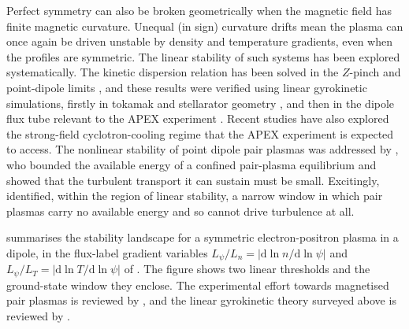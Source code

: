 \documentclass{jpp}
\newcommand{\rmd}{\text{d}}
\begin{document}
Perfect symmetry can also be broken geometrically when the magnetic field has finite magnetic curvature. Unequal (in sign) curvature drifts mean the plasma can once again be driven unstable by density and temperature gradients, even when the profiles are symmetric. The linear stability of such systems has been explored systematically. The kinetic dispersion relation has been solved in the $Z$-pinch and point-dipole limits \citep{MPH2018}, and these results were verified using linear gyrokinetic simulations, firstly in tokamak and stellarator geometry \citep{Kennedy2018}, and then in the dipole flux tube relevant to the APEX experiment \citep{Kennedy2020}. Recent studies have also explored the strong-field cyclotron-cooling regime \citep{KennedyHelander2021a, KennedyHelander2021} that the APEX experiment is expected to access. The nonlinear stability of point dipole pair plasmas was addressed by \citet{Helander2017}, who bounded the available energy of a confined pair-plasma equilibrium and showed that the turbulent transport it can sustain must be small. Excitingly, \citet{Helander2017} identified, within the region of linear stability, a narrow window in which pair plasmas carry no available energy and so cannot drive turbulence at all. 

 summarises the stability landscape for a symmetric electron-positron plasma in a dipole, in the flux-label gradient variables $L_\psi/L_n = |\rmd\ln n/\rmd\ln\psi|$ and $L_\psi/L_T = |\rmd\ln T/\rmd\ln\psi|$ of \citet{HelanderConnor2016}. The figure shows two linear thresholds and the ground-state window they enclose. The experimental effort towards magnetised pair plasmas is reviewed by \citet{Stoneking2020}, and the linear gyrokinetic theory surveyed above is reviewed by \citet{Mishchenko2023}.
\end{document}
